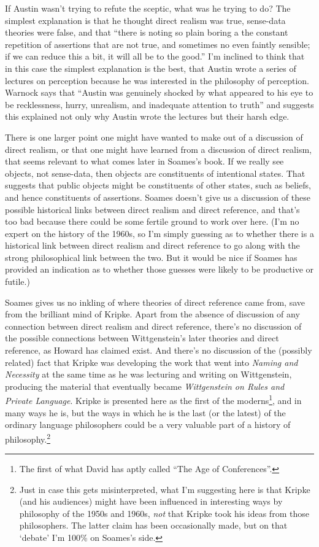 If Austin wasn't trying to refute the sceptic, what was he trying to do? The simplest explanation is that he thought direct realism was true, sense-data theories were false, and that ``there is noting so plain boring a the constant repetition of assertions that are not true, and sometimes no even faintly sensible; if we can reduce this a bit, it will all be to the good.'' \cite[5]{Austin1962} I'm inclined to think that in this case the simplest explanation is the best, that Austin wrote a series of lectures on perception because he was interested in the philosophy of perception. Warnock says that ``Austin was genuinely shocked by what appeared to his eye to be recklessness, hurry, unrealism, and inadequate attention to truth'' \cite[154]{Warnock1989} and suggests this explained not only why Austin wrote the lectures but their harsh edge.

There is one larger point one might have wanted to make out of a discussion of direct realism, or that one might have learned from a discussion of direct realism, that seems relevant to what comes later in Soames's book. If we really see objects, not sense-data, then objects are constituents of intentional states. That suggests that public objects might be constituents of other states, such as beliefs, and hence constituents of assertions. Soames doesn't give us a discussion of these possible historical links between direct realism and direct reference, and that's too bad because there could be some fertile ground to work over here. (I'm no expert on the history of the 1960s, so I'm simply guessing as to whether there is a historical link between direct realism and direct reference to go along with the strong philosophical link between the two. But it would be nice if Soames has provided an indication as to whether those guesses were likely to be productive or futile.)

Soames gives us no inkling of where theories of direct reference came from, save from the brilliant mind of Kripke. Apart from the absence of discussion of any connection between direct realism and direct reference, there's no discussion of the possible connections between Wittgenstein's later theories and direct reference, as Howard \citet{Wettstein2004} has claimed exist. And there's no discussion of the (possibly related) fact that Kripke was developing the work that went into \textit{Naming and Necessity} at the same time as he was lecturing and writing on Wittgenstein, producing the material that eventually became \textit{Wittgenstein on Rules and Private Language}. Kripke is presented here as the first of the moderns\footnote{The first of what David \citet{Armstrong2000} has aptly called ``The Age of Conferences''.}, and in many ways he is, but the ways in which he is the last (or the latest) of the ordinary language philosophers could be a very valuable part of a history of philosophy.\footnote{Just in case this gets misinterpreted, what I'm suggesting here is that Kripke (and his audiences) might have been influenced in interesting ways by philosophy of the 1950s and 1960s, \textit{not} that Kripke took his ideas from those philosophers. The latter claim has been occasionally made, but on that `debate' \citep{Soames1998a, Soames1998b} I'm 100\% on Soames's side.}


